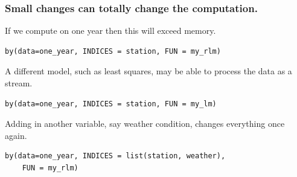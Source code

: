 \documentclass{beamer}
\begin{document}
\begin{frame}[fragile]

    \frametitle{Small changes can totally change the
    computation.}


    If we compute on one year then this will exceed memory.

\begin{verbatim}
by(data=one_year, INDICES = station, FUN = my_rlm)
\end{verbatim}

\pause 

    A different model, such as least squares, may be able to process the
    data as a stream.

\begin{verbatim}
by(data=one_year, INDICES = station, FUN = my_lm)
\end{verbatim}

\pause 

    Adding in another variable, say weather condition, changes everything
    once again.

\begin{verbatim}
by(data=one_year, INDICES = list(station, weather),
    FUN = my_rlm)
\end{verbatim}

%
%

\end{frame}
\end{document}
